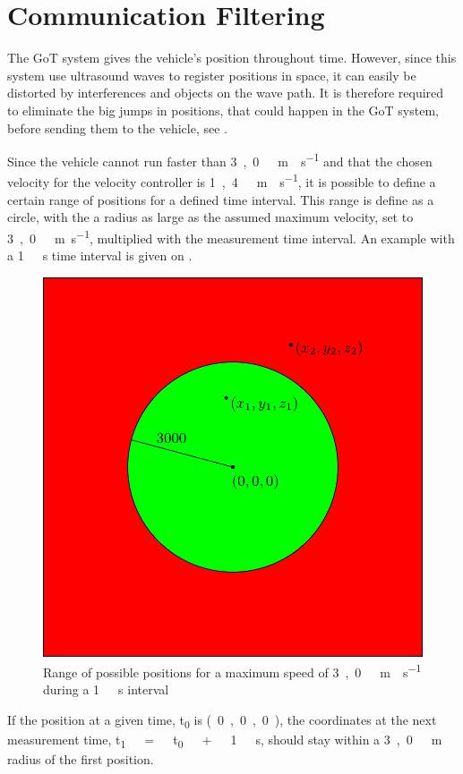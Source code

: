 \section{Communication Filtering}
The GoT system gives the vehicle's position throughout time. However, since this system use ultrasound waves to register positions in space, it can easily be distorted by interferences and objects on the wave path. It is therefore required to eliminate the big jumps in positions, that could happen in the GoT system, before sending them to the vehicle, see .

Since the vehicle cannot run faster than \si{3,0\ m \cdot s^{-1}} and that the chosen velocity for the velocity controller is \si{1,4\ m \cdot s^{-1}}, it is possible to define a certain range of positions for a defined time interval. This range is define as a circle, with the a radius as large as the assumed maximum velocity, set to \si{3,0\ m.s^{-1}}, multiplied with the measurement time interval. An example with a \si{1\ s} time interval is given on .
\begin{figure}[H]
  \centering
  \includegraphics[scale=0.6]{figures/GoTFilterSimple.pdf}
  \caption{Range of possible positions for a maximum speed of \si{3,0\ m \cdot s^{-1}} during a \si{1\ s} interval}
  \label{GoTFilterSimple}
\end{figure}
If the position at a given time, \si{t_0} is \si{(0,0,0)}, the coordinates at the next measurement time, \si{t_1\ =\ t_0\ +\ 1\ s}, should stay within a \si{3,0\ m} radius of the first position.

